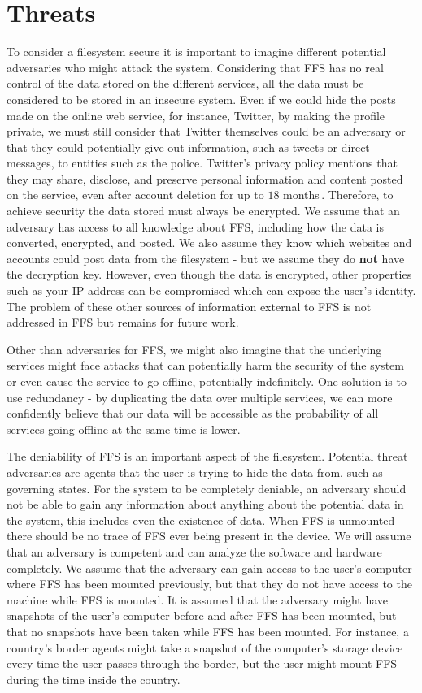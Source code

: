 \section{Threats}
To consider a filesystem secure it is important to imagine different potential adversaries who might attack the system. Considering that \gls{FFS} has no real control of the data stored on the different services, all the data must be considered to be stored in an insecure system. Even if we could hide the posts made on the online web service, for instance, Twitter, by making the profile private, we must still consider that Twitter themselves could be an adversary or that they could potentially give out information, such as tweets or direct messages, to entities such as the police. Twitter's privacy policy mentions that they may share, disclose, and preserve personal information and content posted on the service, even after account deletion for up to $18$ months\,\cite{TwitterPrivacyPolicy}. Therefore, to achieve security the data stored must always be encrypted. We assume that an adversary has access to all knowledge about \gls{FFS}, including how the data is converted, encrypted, and posted. We also assume they know which websites and accounts could post data from the filesystem - but we assume they do \textbf{not} have the decryption key. However, even though the data is encrypted, other properties such as your IP address can be compromised which can expose the user's identity. The problem of these other sources of information external to \gls{FFS} is not addressed in \gls{FFS} but remains for future work.

Other than adversaries for \gls{FFS}, we might also imagine that the underlying services might face attacks that can potentially harm the security of the system or even cause the service to go offline, potentially indefinitely. One solution is to use redundancy - by duplicating the data over multiple services, we can more confidently believe that our data will be accessible as the probability of all services going offline at the same time is lower.

The deniability of \gls{FFS} is an important aspect of the filesystem. Potential threat adversaries are agents that the user is trying to hide the data from, such as governing states. For the system to be completely deniable, an adversary should not be able to gain any information about anything about the potential data in the system, this includes even the existence of data. When \gls{FFS} is unmounted there should be no trace of \gls{FFS} ever being present in the device. We will assume that an adversary is competent and can analyze the software and hardware completely. We assume that the adversary can gain access to the user's computer where \gls{FFS} has been mounted previously, but that they do not have access to the machine while \gls{FFS} is mounted. It is assumed that the adversary might have snapshots of the user's computer before and after \gls{FFS} has been mounted, but that no snapshots have been taken while \gls{FFS} has been mounted. For instance, a country's border agents might take a snapshot of the computer's storage device every time the user passes through the border, but the user might mount \gls{FFS} during the time inside the country.